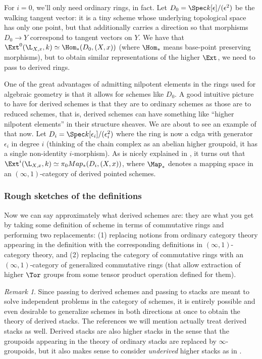 \documentclass[12pt]{amsart}
\theoremstyle{definition} \newtheorem{definition}[theorem]{Definition}
\theoremstyle{remark} \newtheorem{remark}[theorem]{Remark}
\numberwithin{equation}{section}
\newcommand{\oo}{\infty}
\newcommand{\io}{$(\oo,1)$}
\begin{document}
For $i=0$, we'll only need ordinary rings, in fact. Let $D_0 = \Spec
k[\epsilon]/(\epsilon^2)$ be the walking tangent vector: it is a tiny
scheme whose underlying topological space has only one point, but that
additionally carries a direction so that morphisms $D_0 \to Y$
correspond to tangent vectors on $Y$.  We have that $\Ext^0(\L_{X,x},
k) \simeq \Hom_\ast(D_0, (X,x))$ (where $\Hom_\ast$ means base-point
preserving morphisms), but to obtain similar representations of the
higher $\Ext$, we need to pass to derived rings.

One of the great advantages of admitting nilpotent elements in the
rings used for algebraic geometry is that it allows for schemes like
$D_0$. A good intuitive picture to have for derived schemes is that
they are to ordinary schemes as those are to reduced schemes, that is,
derived schemes can have something like ``higher nilpotent elements''
in their structure sheaves. We are about to see an example of that
now. Let $D_i = \Spec k[\epsilon_i]/(\epsilon_i^2)$ where the ring is
now a cdga with generator $\epsilon_i$ in degree $i$ (thinking of the
chain complex as an abelian higher groupoid, it has a single
non-identity $i$-morphism). As is nicely explained in \cite{VezzosiL},
it turns out that $\Ext^i(\L_{X,x}, k) \simeq \pi_0 Map_\ast(D_i,
(X,x))$, where $\Map_\ast$ denotes a mapping space in an \io-category
of derived pointed schemes.

\subsubsection{Rough sketches of the definitions}

Now we can say approximately what derived schemes are: they are what
you get by taking some definition of scheme in terms of commutative
rings and performing two replacements: (1) replacing notions from
ordinary category theory appearing in the definition with the
corresponding definitions in \io-category theory, and (2) replacing
the category of commutative rings with an \io-category of generalized
commutative rings (that allow extraction of higher $\Tor$ groups from
some tensor product operation defined for them).

\begin{remark}
  Since passing to derived schemes and passing to stacks are meant
  to solve independent problems in the category of schemes, it is
  entirely possible and even desirable to generalize schemes in both
  directions at once to obtain the theory of derived stacks.
  The references we will mention actually treat derived stacks as well.
  Derived stacks are also higher stacks in the sense that
  the groupoids appearing in the theory of ordinary stacks are
  replaced by $\oo$-groupoids, but it also makes sense to consider
  \emph{underived} higher stacks as in \cite{SimpsonStacks}.
\end{remark}
\end{document}
